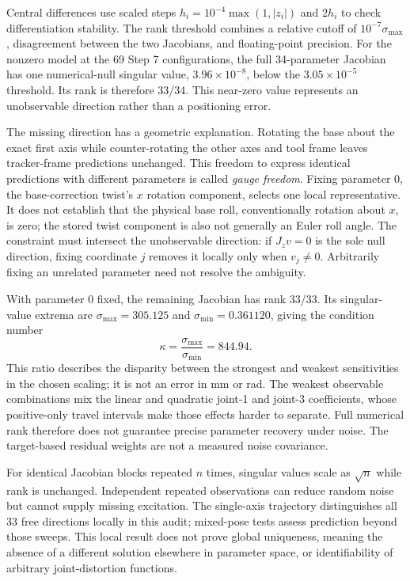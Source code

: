 \documentclass[11pt,letterpaper]{article}
\begin{document}
Central differences use scaled steps $h_i=10^{-4}\max(1,|z_i|)$ and $2h_i$ to check differentiation stability. The rank threshold combines a relative cutoff of $10^{-7}\sigma_{\max}$, disagreement between the two Jacobians, and floating-point precision. For the nonzero model at the 69 Step 7 configurations, the full 34-parameter Jacobian has one numerical-null singular value, $3.96\times10^{-8}$, below the $3.05\times10^{-5}$ threshold. Its rank is therefore 33/34. This near-zero value represents an unobservable direction rather than a positioning error.

The missing direction has a geometric explanation. Rotating the base about the exact first axis while counter-rotating the other axes and tool frame leaves tracker-frame predictions unchanged. This freedom to express identical predictions with different parameters is called \emph{gauge freedom}. Fixing parameter 0, the base-correction twist's $x$ rotation component, selects one local representative. It does not establish that the physical base roll, conventionally rotation about $x$, is zero; the stored twist component is also not generally an Euler roll angle. The constraint must intersect the unobservable direction: if $J_zv=0$ is the sole null direction, fixing coordinate $j$ removes it locally only when $v_j\neq0$. Arbitrarily fixing an unrelated parameter need not resolve the ambiguity.

With parameter 0 fixed, the remaining Jacobian has rank 33/33. Its singular-value extrema are $\sigma_{\max}=305.125$ and $\sigma_{\min}=0.361120$, giving the condition number
\begin{equation*}
\kappa=\frac{\sigma_{\max}}{\sigma_{\min}}=844.94.
\end{equation*}
This ratio describes the disparity between the strongest and weakest sensitivities in the chosen scaling; it is not an error in mm or rad. The weakest observable combinations mix the linear and quadratic joint-1 and joint-3 coefficients, whose positive-only travel intervals make those effects harder to separate. Full numerical rank therefore does not guarantee precise parameter recovery under noise. The target-based residual weights are not a measured noise covariance.

For identical Jacobian blocks repeated $n$ times, singular values scale as $\sqrt{n}$ while rank is unchanged. Independent repeated observations can reduce random noise but cannot supply missing excitation. The single-axis trajectory distinguishes all 33 free directions locally in this audit; mixed-pose tests assess prediction beyond those sweeps. This local result does not prove global uniqueness, meaning the absence of a different solution elsewhere in parameter space, or identifiability of arbitrary joint-distortion functions.
\end{document}
